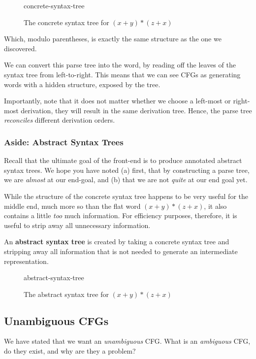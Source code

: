 \begin{figure}[H]
    \centering
    {concrete-syntax-tree}
    \caption{The concrete syntax tree for $(x+y)*(z+x)$}
    \label{fig:par-cst}
\end{figure}

Which, modulo parentheses, is exactly the same structure as the one we discovered. 

We can convert this parse tree into the word, by reading off the leaves of the syntax tree from left-to-right. This means that we can see CFGs as generating words with a hidden structure, exposed by the tree.

Importantly, note that it does not matter whether we choose a left-most or right-most derivation, they will result in the same derivation tree. Hence, the parse tree \textit{reconciles} different derivation orders. 

\subsubsection{Aside: Abstract Syntax Trees}
Recall that the ultimate goal of the front-end is to produce annotated abstract syntax trees. We hope you have noted (a) first, that by constructing a parse tree, we are \textit{almost} at our end-goal, and (b) that we are not \textit{quite} at our end goal yet.

While the structure of the concrete syntax tree happens to be very useful for the middle end, much more so than the flat word $(x+y)*(z+x)$, it also contains a little \textit{too} much information. For efficiency purposes, therefore, it is useful to strip away all unnecessary information. 

An \textbf{abstract syntax tree} is created by taking a concrete syntax tree and stripping away all information that is not needed to generate an intermediate representation. 

\begin{figure}[H]
    \centering
    {abstract-syntax-tree}
    \caption{The abstract syntax tree for $(x+y)*(z+x)$}
    \label{fig:par-ast}
\end{figure}

\subsection{Unambiguous CFGs}\label{section:cfg-ambiguity}
We have stated that we want an \textit{unambiguous} CFG. What is an \textit{ambiguous} CFG, do they exist, and why are they a problem?

